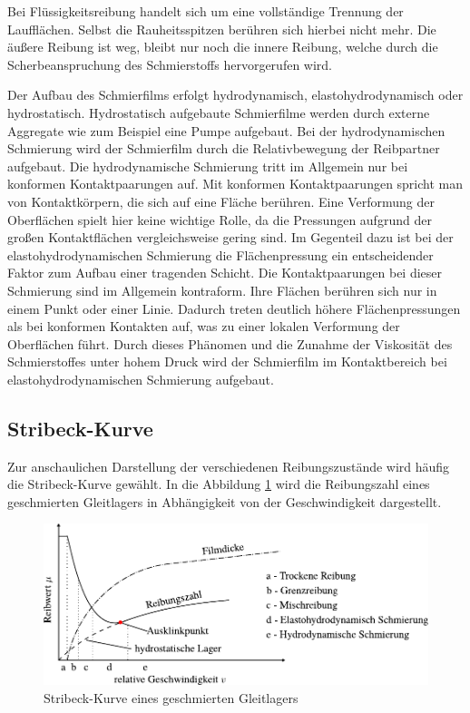Bei Flüssigkeitsreibung handelt sich um eine vollständige Trennung der Laufflächen.
Selbst die Rauheitsspitzen berühren sich hierbei nicht mehr.
Die äußere Reibung ist weg, bleibt nur noch die innere Reibung, welche durch die Scherbeanspruchung des Schmierstoffs hervorgerufen wird.

Der Aufbau des Schmierfilms erfolgt hydrodynamisch, elastohydrodynamisch oder hydrostatisch.
Hydrostatisch aufgebaute Schmierfilme werden durch externe Aggregate wie zum Beispiel eine Pumpe aufgebaut.
Bei der hydrodynamischen Schmierung wird der Schmierfilm durch die Relativbewegung der Reibpartner aufgebaut.
Die hydrodynamische Schmierung tritt im Allgemein nur bei konformen Kontaktpaarungen auf.
Mit konformen Kontaktpaarungen spricht man von Kontaktkörpern, die sich auf eine Fläche berühren.
Eine Verformung der Oberflächen spielt hier keine wichtige Rolle, da die Pressungen aufgrund der großen Kontaktflächen vergleichsweise gering sind.
Im Gegenteil dazu ist bei der elastohydrodynamischen Schmierung die Flächenpressung ein entscheidender Faktor zum Aufbau einer tragenden Schicht.
Die Kontaktpaarungen bei dieser Schmierung sind im Allgemein kontraform.
Ihre Flächen berühren sich nur in einem Punkt oder einer Linie.
Dadurch treten deutlich höhere Flächenpressungen als bei konformen Kontakten auf, was zu einer lokalen Verformung der Oberflächen führt.
Durch dieses Phänomen und die Zunahme der Viskosität des Schmierstoffes unter hohem Druck wird der Schmierfilm im Kontaktbereich bei elastohydrodynamischen Schmierung aufgebaut.

\subsection{Stribeck-Kurve}
\label{sub:stribeck-kurve}

Zur anschaulichen Darstellung der verschiedenen Reibungszustände wird häufig die Stribeck-Kurve gewählt.
In die Abbildung \ref{fig:stribeck-kurve} wird die Reibungszahl eines geschmierten Gleitlagers in Abhängigkeit von der Geschwindigkeit dargestellt.
\begin{figure}[htb]
    \centering
    \includegraphics[]{./images/stribeckkurve.pdf}
    \caption{Stribeck-Kurve eines geschmierten Gleitlagers \cite{ikz_haustechnik}}
    \label{fig:stribeck-kurve}
\end{figure}
%

